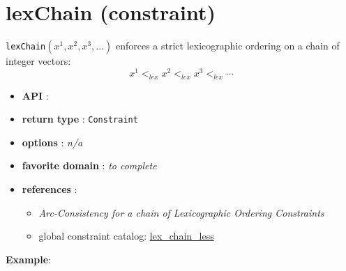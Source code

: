 \label{lexchain}
\hypertarget{lexchain}{}

\section{lexChain (constraint)}\label{lexchain:lexchainconstraint}\hypertarget{lexchain:lexchainconstraint}{}
\begin{notedef}
\texttt{lexChain}$(x^1 ,x^2 ,x^3,\ldots)$ enforces a strict lexicographic ordering on a chain of integer vectors:
$$x^1 <_{lex} x^2 <_{lex} x^3 <_{lex}\cdots$$
\end{notedef}

\begin{itemize}
	\item \textbf{API} : 
	\item \textbf{return type} : \texttt{Constraint}
	\item \textbf{options} : \emph{n/a}
	\item \textbf{favorite domain} : \emph{to complete}
	\item \textbf{references} :
      \begin{itemize}
      \item \cite{BeldiceanuSICS02} \emph{Arc-Consistency for a chain of Lexicographic Ordering Constraints} 
      \item global constraint catalog: \href{http://www.emn.fr/x-info/sdemasse/gccat/Clex_chain_less.html}{lex\_chain\_less}
      \end{itemize}
\end{itemize}

\textbf{Example}:
